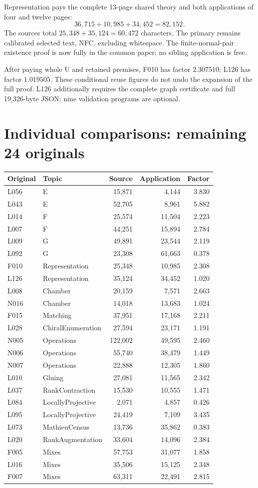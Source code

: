 \documentclass[11pt,a4paper]{article}
\begin{document}
Representation pays the complete 13-page shared theory and both applications of four and twelve pages: \[36,715+10,985+34,452=82,152.\] The sources total $25,348+35,124=60,472$ characters. The primary remains calibrated selected text, NFC, excluding whitespace. The finite-normal-pair existence proof is now fully in the common paper; no sibling application is free.

After paying whole U and retained premises, F010 has factor $2.307510$; L126 has factor $1.019505$. These conditional reuse figures do not undo the expansion of the full proof. L126 additionally requires the complete graph certificate and full 19,326-byte JSON; nine validation programs are optional.
\newpage
\section*{Individual comparisons: remaining 24 originals}
\begin{center}\small\begin{tabular}{llrrr}\toprule
Original & Topic & Source & Application & Factor\\\midrule
L056 & E & 15,871 & 4,144 & 3.830 \\
L043 & E & 52,705 & 8,961 & 5.882 \\
L014 & F & 25,574 & 11,504 & 2.223 \\
L007 & F & 44,251 & 15,894 & 2.784 \\
L009 & G & 49,891 & 23,544 & 2.119 \\
L092 & G & 23,308 & 61,663 & 0.378 \\
F010 & Representation & 25,348 & 10,985 & 2.308 \\
L126 & Representation & 35,124 & 34,452 & 1.020 \\
L008 & Chamber & 20,159 & 7,571 & 2.663 \\
N016 & Chamber & 14,018 & 13,683 & 1.024 \\
F015 & Matching & 37,951 & 17,168 & 2.211 \\
L028 & ChiralEnumeration & 27,594 & 23,171 & 1.191 \\
N005 & Operations & 122,002 & 49,595 & 2.460 \\
N006 & Operations & 55,740 & 38,479 & 1.449 \\
N007 & Operations & 22,888 & 12,305 & 1.860 \\
L010 & Gluing & 27,081 & 11,565 & 2.342 \\
L037 & RankContraction & 15,530 & 10,555 & 1.471 \\
L084 & LocallyProjective & 2,071 & 4,857 & 0.426 \\
L095 & LocallyProjective & 24,419 & 7,109 & 3.435 \\
L073 & MathieuCensus & 13,736 & 35,862 & 0.383 \\
L020 & RankAugmentation & 33,604 & 14,096 & 2.384 \\
F005 & Mixes & 57,753 & 31,077 & 1.858 \\
L016 & Mixes & 35,506 & 15,125 & 2.348 \\
F007 & Mixes & 63,311 & 22,491 & 2.815 \\\bottomrule\end{tabular}\end{center}
\end{document}
